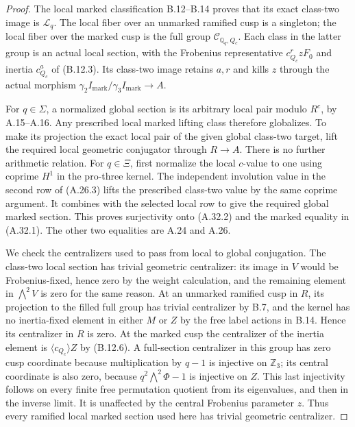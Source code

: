 \begin{proof}
The local marked classification
B.12--B.14 proves that its exact
class-two image is $\mathscr L_q$.
The local fiber over an unmarked
ramified cusp is a singleton;
the local fiber over the marked
cusp is the full group
$\mathcal C_{\mathbb Q_q,Q_c}$.
Each class in the latter group
is an actual local section,
with the Frobenius representative
$c_{Q_c}^r zF_0$ and inertia
$c_{Q_c}^a$ of (B.12.3).
Its class-two image retains
$a,r$ and kills $z$ through
the actual morphism
$\gamma_2I_{\mathrm{mark}}/
 \gamma_3I_{\mathrm{mark}}\to A$.

For $q\in\Sigma$, a normalized
global section is its arbitrary
local pair modulo $R^c$, by
A.15--A.16. Any prescribed local
marked lifting class therefore
globalizes. To make its projection
the exact local pair of the
given global class-two target,
lift the required local geometric
conjugator through $R\to A$.
There is no further arithmetic
relation. For $q\in\Xi$, first
normalize the local $c$-value
to one using coprime $H^1$
in the pro-three kernel.
The independent involution
value in the second row of
(A.26.3) lifts the prescribed
class-two value by the same
coprime argument. It combines
with the selected local row
to give the required global
marked section. This proves
surjectivity onto (A.32.2)
and the marked equality in
(A.32.1). The other two
equalities are A.24 and A.26.

We check the centralizers used
to pass from local to global
conjugation. The class-two local
section has trivial geometric
centralizer: its image in $V$
would be Frobenius-fixed, hence
zero by the weight calculation,
and the remaining element in
$\bigwedge^2V$ is zero for the
same reason. At an unmarked
ramified cusp in $R$, its
projection to the filled full
group has trivial centralizer
by B.7, and the kernel has
no inertia-fixed element in
either $M$ or $Z$ by the
free label actions in B.14.
Hence its centralizer in
$R$ is zero. At the marked
cusp the centralizer of the
inertia element is
$\langle c_{Q_c}\rangle Z$
by (B.12.6). A full-section
centralizer in this group
has zero cusp coordinate
because multiplication by
$q-1$ is injective on
$\mathbb Z_3$; its central
coordinate is also zero,
because $q^2\bigwedge^2\Phi-1$
is injective on $Z$.
This last injectivity follows
on every finite free permutation
quotient from its eigenvalues,
and then in the inverse limit.
It is unaffected by the
central Frobenius parameter
$z$. Thus every ramified
local marked section used
here has trivial geometric
centralizer.


\end{proof}
